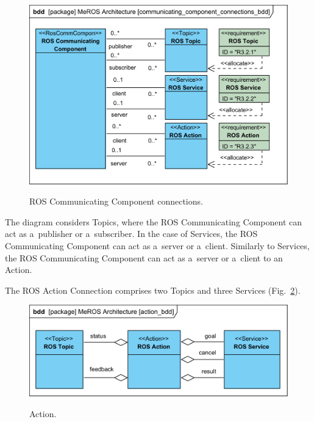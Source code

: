\documentclass[11pt,oneside,a4paper]{report}
\begin{document}
		 \begin{figure}[H]
		\centering
		\begin{center}
			{\includegraphics[scale=.95]{diagrams/communicating_component_connections_bdd.png}}
		\end{center}
		\caption{ROS Communicating Component connections.} 
		\label{fig:communicating_component_connections_bdd}
	\end{figure}
	
	 The diagram considers Topics, where the ROS Communicating Component can act as a~publisher or a~subscriber. In the case of Services, the ROS Communicating Component can act as a~server or a~client.	Similarly to Services, the ROS Communicating Component can act as a~server or a~client to an Action.	
	 	 
	 The ROS Action Connection comprises two Topics and three Services (Fig.~\ref{fig:action_bdd}).
	
	\begin{figure}[hbt]
		\centering
		\begin{center}
			{\includegraphics[scale=1.0]{diagrams/action_bdd.png}}
		\end{center}
		\caption{Action.} 
		\label{fig:action_bdd}
	\end{figure}
	
\end{document}
